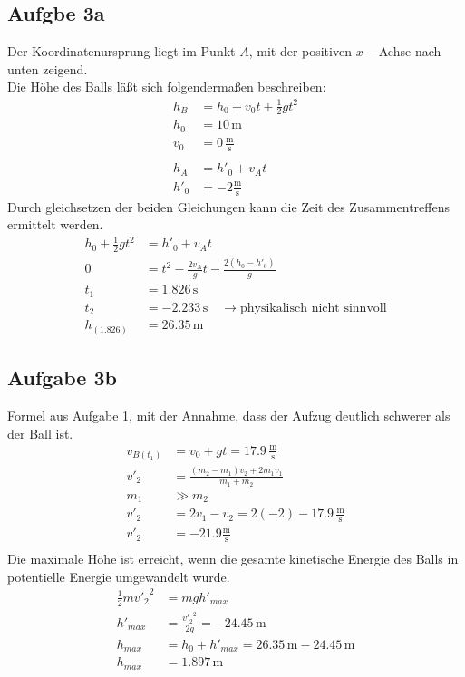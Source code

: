 \documentclass[a4paper,10pt]{extarticle}
\begin{document}
  \subsection*{Aufgbe 3a}
  Der Koordinatenursprung liegt im Punkt $A$, mit der positiven $x-$Achse nach unten zeigend. \\ 
  Die Höhe des Balls läßt sich folgendermaßen beschreiben:
  \begin{align*}
  h_B &= h_0 + v_0 t + \frac{1}{2}gt^2 \\
  h_0 &= 10 \, \mbox{m} \\ 
  v_0 &= 0 \, \frac{\mbox{m}}{\mbox{s}} \\ \\
  h_A &= h'_0 + v_A t \\
  h'_0 &= -2 \frac{\mbox{m}}{\mbox{s}}
  \end{align*}
  Durch gleichsetzen der beiden Gleichungen kann die Zeit des Zusammentreffens ermittelt werden.
  \begin{align*}
  h_0 + \frac{1}{2}gt^2 &= h'_0 + v_A t \\
  0 &= t^2 - \frac{2 v_A}{g} t - \frac{2(h_0 - h'_0)}{g} \\
  t_1 &= 1.826 \, \mbox{s} \\
  t_2 &= -2.233 \, \mbox{s} \quad \rightarrow \mbox{physikalisch nicht sinnvoll}\\
  h_{(1.826)} &= 26.35\, \mbox{m}
  \end{align*}

  \subsection*{Aufgabe 3b}
  Formel aus Aufgabe 1, mit der Annahme, dass der Aufzug deutlich schwerer als der Ball ist.
  \begin{align*}
  v_{B(t_1)} &= v_0 + gt = 17.9 \, \frac{\mbox{m}}{\mbox{s}} \\
  v'_2 &= \frac{(m_2 - m_1)v_2 + 2 m_1 v_1}{m_1 + m_2} \\
  m_1 &\gg m_2 \\
  v'_2 &= 2v_1 - v_2 = 2(-2) - 17.9 \, \frac{\mbox{m}}{\mbox{s}} \\
  v'_2 &= -21.9 \frac{\mbox{m}}{\mbox{s}} \\
  \end{align*}
  Die maximale Höhe ist erreicht, wenn die gesamte kinetische Energie des Balls in potentielle Energie umgewandelt wurde.
  \begin{align*}
  \frac{1}{2} m {v'_2}^2 &= m g h'_{max} \\
  h'_{max} &= \frac{{v'_2}^2}{2g} = -24.45 \, \mbox{m} \\
  h_{max} &= h_0 + h'_{max} = 26.35 \, \mbox{m} - 24.45 \, \mbox{m} \\
  h_{max} &= 1.897 \, \mbox{m}
  \end{align*}
\end{document}
